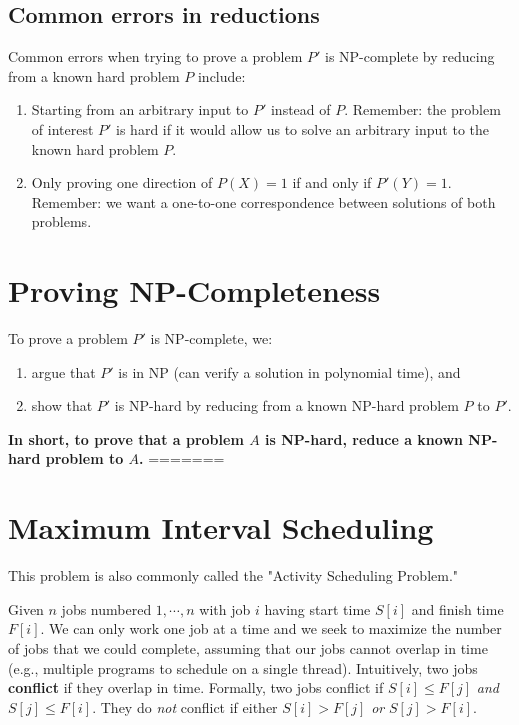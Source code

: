 \documentclass[titlepage, 12pt, leqno]{article}
\begin{document}
\subsection{Common errors in reductions}
Common errors when trying to prove a problem $P'$ is NP-complete by reducing
from a known hard problem $P$ include:
\begin{enumerate}
    \item Starting from an arbitrary input to $P'$ instead of $P$. Remember:
        the problem of interest $P'$ is hard if it would allow us to solve an
        arbitrary input to the known hard problem $P$.
    \item Only proving one direction of $P(X) = 1$ if and only if $P'(Y)=1$.
        Remember: we want a one-to-one correspondence between solutions of
        both problems.
\end{enumerate}

\pagebreak
\section{Proving NP-Completeness}
To prove a problem $P'$ is NP-complete, we:
\begin{enumerate}
    \item argue that $P'$ is in NP (can verify a solution in polynomial time), 
        and
    \item show that $P'$ is NP-hard by reducing from a known NP-hard problem
        $P$ to $P'$.
\end{enumerate}
\textbf{In short, to prove that a problem $A$ is NP-hard, reduce a known NP-hard
problem to $A$.}
=======
\section{Maximum Interval Scheduling}

\begin{note}
    This problem is also commonly called the "Activity Scheduling Problem."
\end{note}

Given $n$ jobs numbered $1, \cdots ,n$ with job $i$ having start time $S[i]$ and
finish time $F[i]$. We can only work one job at a time and we seek to maximize
the number of jobs that we could complete, assuming that our jobs cannot
overlap in time (e.g., multiple programs to schedule on a single thread).
Intuitively, two jobs \textbf{conflict} if they overlap in time. Formally,
two jobs conflict if $S[i] \le F[j]$ \textit{and} $S[j] \le F[i]$. They do
\textit{not} conflict if either $S[i] > F[j]$ \textit{or} $S[j] > F[i]$.
\end{document}
